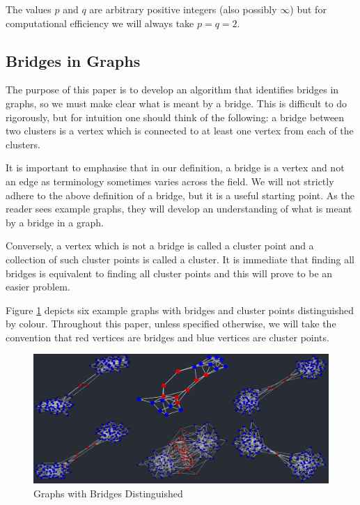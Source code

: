 \documentclass[12pt,a4paper]{amsart}
\numberwithin{equation}{section}
\theoremstyle{plain}
\theoremstyle{definition}
\begin{document}
The values $p$ and $q$ are arbitrary positive integers (also possibly $\infty$) but for computational efficiency we will always take $p=q=2$. 


\subsection{Bridges in Graphs}

The purpose of this paper is to develop an algorithm that identifies bridges in graphs, so we must make clear what is meant by a bridge. This is difficult to do rigorously, but for intuition one should think of the following: a bridge between two clusters is a vertex which is connected to at least one vertex from each of the clusters.

It is important to emphasise that in our definition, a bridge is a vertex and not an edge as terminology sometimes varies across the field. We will not strictly adhere to the above definition of a bridge, but it is a useful starting point. As the reader sees example graphs, they will develop an understanding of what is meant by a bridge in a graph.

Conversely, a vertex which is not a bridge is called a cluster point and a collection of such cluster points is called a cluster. It is immediate that finding all bridges is equivalent to finding all cluster points and this will prove to be an easier problem.

Figure \ref{bridges} depicts six example graphs with bridges and cluster points distinguished by colour. Throughout this paper, unless specified otherwise, we will take the convention that red vertices are bridges and blue vertices are cluster points.

\begin{figure}[h]
	\centering
	\includegraphics[scale=0.5]{BridgesDistinguished.jpg}
	\caption{Graphs with Bridges Distinguished}
	\label{bridges}
\end{figure}
\end{document}
